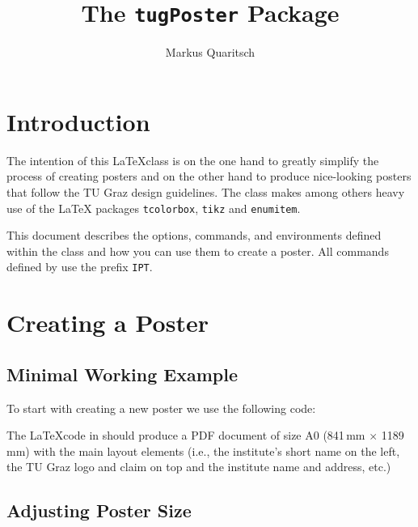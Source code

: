 
\title{The \texttt{tugPoster} Package}
\author{Markus Quaritsch}


	\maketitle

	\tableofcontents

\section{Introduction}

The intention of this \LaTeX class is on the one hand to greatly simplify the process of creating posters and on the other hand to produce nice-looking posters that follow the TU Graz design guidelines. The \tugPoster{} class makes among others heavy use of the  \LaTeX{} packages \texttt{tcolorbox}, \texttt{tikz} and \texttt{enumitem}. 

This document describes the options, commands, and environments defined within the \tugPoster{} class and how you can use them to create a poster. All commands defined by \tugPoster{} use the prefix \texttt{IPT}.


\section{Creating a Poster}

\subsection{Minimal Working Example}

To start with creating a new poster we use the following code:


The \LaTeX code in  should produce a PDF document of size A0 (841\,mm $\times$ 1189\,mm) with the main layout elements (i.e., the institute's short name on the left, the TU Graz logo and claim on top and the institute name and address, etc.)

\subsection{Adjusting Poster Size}

